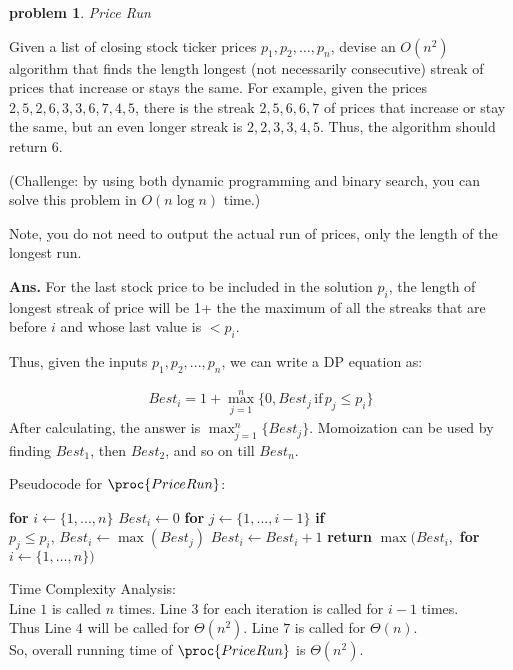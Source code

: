 \documentclass[11pt]{article}
\newtheorem{problem}{\sc\color{cit}problem}
\begin{document}
\begin{problem}{Price Run}\end{problem}
Given a list of closing stock ticker prices $p_1,p_2,\ldots,p_n$, devise an $O(n^2)$ algorithm that finds
 the length longest (not necessarily consecutive) streak of prices  that  increase or stays the same. 
For example, given the prices $2,5,2,6,3,3,6,7,4,5$, there is the streak $2,5,6,6,7$ of prices that increase 
or stay the same, but an even longer streak is $2,2,3,3,4,5$. Thus, the algorithm should return 6.  

(Challenge: by using both dynamic programming and binary search, you can solve this problem in $O(n \log n)$ 
time.)

Note, you do not need to output the actual run of prices, only the length of the longest run.
\hfill
   
\noindent \textbf{Ans.}
For the last stock price to be included in the solution $p_i$, the length of longest streak of price will be 1+ the the maximum of all the streaks that are before $i$ and whose last value is $< p_i$. 

Thus, given the inputs $p_1, p_2, ..., p_n$, we can write a DP equation as:

\begin{equation}
    \begin{split}
       Best_i = 1+\max_{j=1}^{n} \{0,Best_j \, \text{if} \, p_j \leq p_i \}
    \end{split}
\end{equation}
After calculating, the answer is $\max_{j=1}^{n} \{Best_j\}$. Momoization can be used by finding $Best_1$, then $Best_2$, and so on till $Best_n$. 

\hfill

\noindent Pseudocode for $\proc{PriceRun}$:
 \begin{codebox}
\li \textbf{for} $i \leftarrow \{1, ..., n\}$
\li \quad $Best_i \leftarrow 0$
\li \quad \textbf{for} $j \leftarrow \{1, ..., i-1\}$
\li \quad \quad \textbf{if} $p_j \leq p_i,\, Best_i \leftarrow \max(Best_j)$
\li \quad $Best_i \leftarrow Best_i + 1$
\li \textbf{return} $\max(Best_i,$ \textbf{for} $i \leftarrow \{1, \ldots, n\})$
\end{codebox}

\noindent Time Complexity Analysis:\\
Line $1$ is called $n$ times. Line $3$ for each iteration is called for $i-1$ times.\\
Thus Line $4$ will be called for  $\Theta(n^2)$. Line $7$ is called for $\Theta(n)$.\\
So, overall running time of $\proc{PriceRun}$ is $\Theta(n^2)$.
\end{document}
